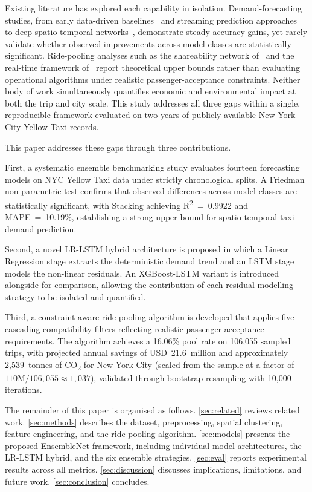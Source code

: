 \documentclass[a4paper,fleqn]{cas-dc}
\begin{document}
Existing literature has explored each capability in isolation.  Demand-forecasting studies, from early data-driven baselines~\cite{dia2002object} and streaming prediction approaches~\cite{moreira2013predicting} to deep spatio-temporal networks~\cite{zhang2017deep,xu2017realtime,kim2020hybrid}, demonstrate steady accuracy gains, yet rarely validate whether observed improvements across model classes are statistically significant.  Ride-pooling analyses such as the shareability network of~\cite{santi2014quantifying} and the real-time framework of~\cite{alonso2017demand} report theoretical upper bounds rather than evaluating operational algorithms under realistic passenger-acceptance constraints.  Neither body of work simultaneously quantifies economic and environmental impact at both the trip and city scale.  This study addresses all three gaps within a single, reproducible framework evaluated on two years of publicly available New York City Yellow Taxi records.

This paper addresses these gaps through three contributions.

First, a systematic ensemble benchmarking study evaluates fourteen forecasting models on NYC Yellow Taxi data under strictly chronological splits.  A Friedman non-parametric test confirms that observed differences across model classes are statistically significant, with Stacking achieving R\textsuperscript{2}~=~0.9922 and MAPE~=~10.19\%, establishing a strong upper bound for spatio-temporal taxi demand prediction.

Second, a novel LR-LSTM hybrid architecture is proposed in which a Linear Regression stage extracts the deterministic demand trend and an LSTM stage models the non-linear residuals.  An XGBoost-LSTM variant is introduced alongside for comparison, allowing the contribution of each residual-modelling strategy to be isolated and quantified.

Third, a constraint-aware ride pooling algorithm is developed that applies five cascading compatibility filters reflecting realistic passenger-acceptance requirements.  The algorithm achieves a 16.06\% pool rate on 106,055 sampled trips, with projected annual savings of USD~21.6~million and approximately 2{,}539~tonnes of CO\textsubscript{2} for New York City (scaled from the sample at a factor of $110\text{M}/106{,}055 \approx 1{,}037$), validated through bootstrap resampling with 10,000 iterations.

The remainder of this paper is organised as follows.  \autoref{sec:related} reviews related work.  \autoref{sec:methods} describes the dataset, preprocessing, spatial clustering, feature engineering, and the ride pooling algorithm.  \autoref{sec:models} presents the proposed EnsembleNet framework, including individual model architectures, the LR-LSTM hybrid, and the six ensemble strategies.  \autoref{sec:eval} reports experimental results across all metrics.  \autoref{sec:discussion} discusses implications, limitations, and future work.  \autoref{sec:conclusion} concludes.
\end{document}
